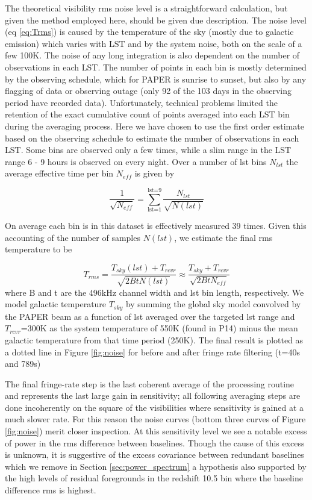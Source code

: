 \documentclass[preprint]{aastex}
\begin{document}
The theoretical visibility rms noise level is a straightforward calculation, but given the method employed here, should be given due description.
The noise level (eq \ref{eq:Trms}) is caused by the temperature of the sky (mostly due to galactic emission) which varies with LST and by the system noise, both on the scale of a few 100K. The noise of any long integration is also dependent on the number of observations in each LST.  The number of points in each bin is mostly determined by the observing schedule, which for PAPER is sunrise to sunset, but also by any flagging of data or observing outage (only 92 of the 103 days in the observing period have recorded data).  Unfortunately, technical problems limited the retention of the exact cumulative count of points averaged into each LST bin during the averaging process.  Here we have chosen to use the first order estimate based on the observing schedule to estimate the number of observations in each LST. Some bins are observed only a few times, while a slim range in the LST range 6 - 9 hours is observed on every night.  Over a number of lst bins $N_{lst}$ the average effective time per bin $N_{eff}$ is given by 

\[
\frac{1}{\sqrt{N_{eff}}} = \sum_\textrm{lst=1}^\textrm{lst=9}{\frac{N_{lst}}{\sqrt{N(lst)}}}
\]

On average each bin is in this dataset is effectively measured 39 times. Given this accounting of the number of samples $N(lst)$, we estimate the final rms temperature to be

\[
T_{rms}  = \frac{T_{sky}(lst) + T_{rcvr}}{\sqrt{2BtN(lst)}} \approx \frac{T_{sky} + T_{rcvr}}{\sqrt{2BtN_{eff}}}
\label{eq:Trms}
\]
where B and t are the 496kHz channel width and lst bin length, respectively. We model galactic temperature $T_{sky}$ by summing the \citep{deOliveiraCosta:2008p2242} global sky model  convolved by the PAPER beam as a function of lst averaged over the targeted lst range and $T_{rcvr}$=300K as the system temperature of 550K (found in P14) minus the mean galactic temperature from that time period (250K). The final result is plotted as a dotted line in Figure \ref{fig:noise} for before and after fringe rate filtering (t=40s and 789s)


The final fringe-rate step is the last coherent average of the processing routine and represents the last large gain in sensitivity; all following averaging steps are done incoherently on the square of the visibilities where sensitivity is gained at a much slower rate. For this reason the noise curves (bottom three curves of Figure \ref{fig:noise})  merit closer inspection.  At this sensitivity level we see a notable excess of power in the rms difference between baselines. Though the cause of this excess is unknown, it is suggestive of the excess covariance between redundant baselines which we remove in Section \ref{sec:power_spectrum} a hypothesis also supported by the high levels of residual foregrounds in the redshift 10.5 bin where the baseline difference rms is highest.
\end{document}
